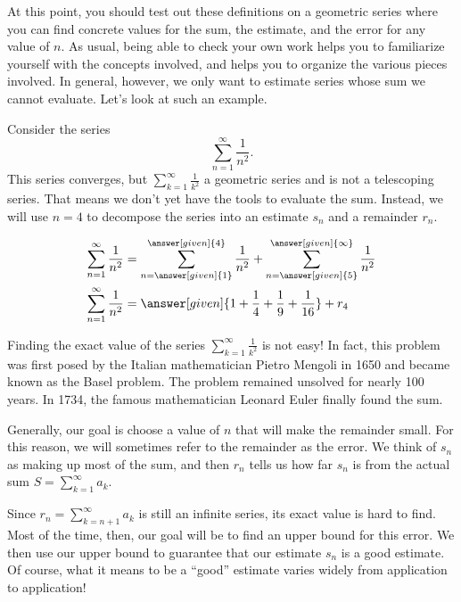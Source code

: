 \documentclass{ximera}
\begin{document}
At this point, you should test out these definitions on a geometric series where you can find concrete values for the sum, the estimate, and the error for any value of $n$.  As usual, being able to check your own work helps you to familiarize yourself with the concepts involved, and helps you to organize the various pieces involved.  In general, however, we only want to estimate series whose sum we cannot evaluate. Let's look at such an example.

\begin{example}
Consider the series
\[
\sum \limits_{n=1}^{\infty} \frac{1}{n^2}.
\]
This series converges, but $\sum_{k=1}^{\infty} \frac{1}{k^2}$  a geometric series and is not a telescoping series.  That means we don't yet have the tools to evaluate the sum.  Instead, we will use $n=4$ to decompose the series into an estimate $s_n$ and a remainder $r_n$.

\begin{explanation}
\begin{align*}
    \sum \limits_{n=1}^\infty \frac{1}{n^2} &= \sum \limits_{n=\answer[given]{1}}^{\answer[given]{4}} \frac{1}{n^2} + \sum \limits_{n=\answer[given]{5}}^{\answer[given]{\infty}} \frac{1}{n^2} \\
    \sum \limits_{n=1}^\infty \frac{1}{n^2} &= \answer[given]{1 + \frac{1}{4} + \frac{1}{9} + \frac{1}{16}} + r_4
\end{align*}
\end{explanation}
\end{example}

\begin{remark}
Finding the exact value of the series $\sum_{k=1}^{\infty} \frac{1}{k^2}$ is not easy!  In fact, this problem was first posed by the Italian mathematician Pietro Mengoli in 1650 and became known as the Basel problem. The problem remained unsolved for nearly 100 years. In 1734, the famous mathematician Leonard Euler finally found the sum.  
\end{remark}

Generally, our goal is choose a value of $n$ that will make the remainder small.  For this reason, we will sometimes refer to the remainder as the error.  We think of $s_n$ as making up most of the sum, and then $r_n$ tells us how far $s_n$ is from the actual sum $S = \sum \limits_{k=1}^\infty a_k$.  

Since $r_n = \sum \limits_{k=n+1}^{\infty} a_k$ is still an infinite series, its exact value is hard to find.  Most of the time, then, our goal will be to find an upper bound for this error.  We then use our upper bound to guarantee that our estimate $s_n$ is a good estimate.  Of course, what it means to be a ``good'' estimate varies widely from application to application!
\end{document}
